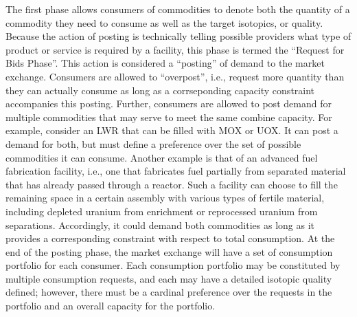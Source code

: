 The first phase allows consumers of commodities to denote both the quantity of a
commodity they need to consume as well as the target isotopics, or
quality. Because the action of posting is technically telling possible providers
what type of product or service is required by a facility, this phase is termed
the ``Request for Bids Phase''. This action is considered a ``posting'' of
demand to the market exchange. Consumers are allowed to ``overpost'', i.e.,
request more quantity than they can actually consume as long as a corrseponding
capacity constraint accompanies this posting. Further, consumers are allowed to
post demand for multiple commodities that may serve to meet the same combine
capacity. For example, consider an LWR that can be filled with MOX or UOX. It
can post a demand for both, but must define a preference over the set of
possible commodities it can consume. Another example is that of an advanced fuel
fabrication facility, i.e., one that fabricates fuel partially from separated
material that has already passed through a reactor. Such a facility can choose
to fill the remaining space in a certain assembly with various types of fertile
material, including depleted uranium from enrichment or reprocessed uranium from
separations. Accordingly, it could demand both commodities as long as it
provides a corresponding constraint with respect to total consumption. At the
end of the posting phase, the market exchange will have a set of consumption
portfolio for each consumer. Each consumption portfolio may be constituted by
multiple consumption requests, and each may have a detailed isotopic quality
defined; however, there must be a cardinal preference over the requests in the
portfolio and an overall capacity for the portfolio.

